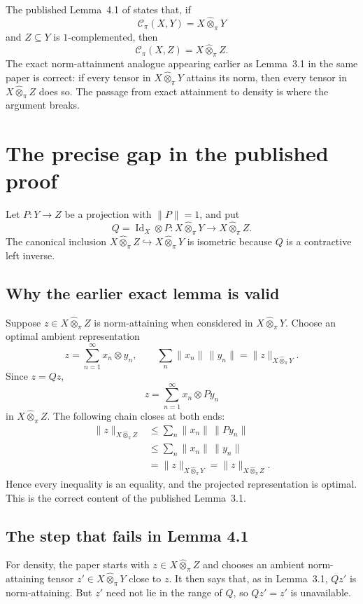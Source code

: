 \documentclass[11pt]{article}
\theoremstyle{definition}
\theoremstyle{remark}
\newcommand{\whot}{\widehat\otimes_\pi}
\newcommand{\Id}{\operatorname{Id}}
\newcommand{\Cpi}{\mathscr C_\pi}
\begin{document}
The published Lemma~4.1 of \cite{GarciaLirolaEtAl2025} states that, if
\[
 \Cpi(X,Y)=X\whot Y
\]
and $Z\subseteq Y$ is $1$-complemented, then
\[
 \Cpi(X,Z)=X\whot Z.
\]
The exact norm-attainment analogue appearing earlier as Lemma~3.1 in the same paper is correct: if every tensor in $X\whot Y$ attains its norm, then every tensor in $X\whot Z$ does so.  The passage from exact attainment to density is where the argument breaks.

\section{The precise gap in the published proof}

Let $P:Y\to Z$ be a projection with $\|P\|=1$, and put
\[
 Q=\Id_X\otimes P:X\whot Y\longrightarrow X\whot Z.
\]
The canonical inclusion $X\whot Z\hookrightarrow X\whot Y$ is isometric because $Q$ is a contractive left inverse.

\subsection{Why the earlier exact lemma is valid}

Suppose $z\in X\whot Z$ is norm-attaining when considered in $X\whot Y$.  Choose an optimal ambient representation
\[
 z=\sum_{n=1}^\infty x_n\otimes y_n,
 \qquad
 \sum_n\|x_n\|\,\|y_n\|=\|z\|_{X\whot Y}.
\]
Since $z=Qz$,
\[
 z=\sum_{n=1}^\infty x_n\otimes Py_n
\]
in $X\whot Z$.  The following chain closes at both ends:
\begin{align*}
 \|z\|_{X\whot Z}
 &\leq \sum_n\|x_n\|\,\|Py_n\|\\
 &\leq \sum_n\|x_n\|\,\|y_n\|\\
 &=\|z\|_{X\whot Y}
 =\|z\|_{X\whot Z}.
\end{align*}
Hence every inequality is an equality, and the projected representation is optimal.  This is the correct content of the published Lemma~3.1.

\subsection{The step that fails in Lemma 4.1}

For density, the paper starts with $z\in X\whot Z$ and chooses an ambient norm-attaining tensor $z'\in X\whot Y$ close to $z$.  It then says that, as in Lemma~3.1, $Qz'$ is norm-attaining.  But $z'$ need not lie in the range of $Q$, so $Qz'=z'$ is unavailable.
\end{document}
